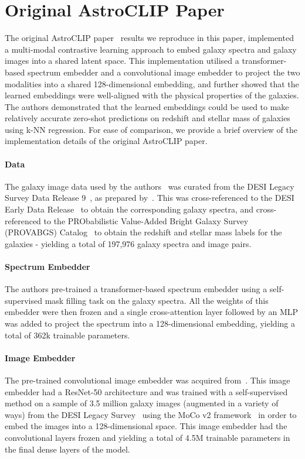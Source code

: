 
\section{Original AstroCLIP Paper}\label{sec:original-paper}
The original AstroCLIP paper~\cite{astroclip} results we reproduce in this paper, implemented a multi-modal contrastive
learning approach to embed galaxy spectra and galaxy images into a shared latent space.
This implementation utilised a transformer-based spectrum embedder and a convolutional image embedder to project the two
modalities into a shared 128-dimensional embedding, and further showed that the learned embeddings were well-aligned
with the physical properties of the galaxies.
The authors demonstrated that the learned embeddings could be used to make relatively accurate zero-shot predictions on
redshift and stellar mass of galaxies using k-NN regression.
For ease of comparison, we provide a brief overview of the implementation details of the original AstroCLIP paper.

\paragraph{Data} The galaxy image data used by the authors~\citep{astroclip} was curated from the DESI Legacy Survey Data
Release 9~\citep{desilegacy2018}, as prepared by~\cite{stein2021}.
This was cross-referenced to the DESI Early Data Release~\citep{desiearly2023} to obtain the corresponding galaxy spectra,
and cross-referenced to the PRObabilistic Value-Added Bright Galaxy Survey (PROVABGS) Catalog~\citep{provabgs2021}
to obtain the redshift and stellar mass labels for the galaxies - yielding a total of 197,976 galaxy spectra and image pairs.

\paragraph{Spectrum Embedder} The authors pre-trained a transformer-based spectrum embedder using a self-supervised mask
filling task on the galaxy spectra.
All the weights of this embedder were then frozen and a single cross-attention layer followed by an MLP was added to project
the spectrum into a 128-dimensional embedding, yielding a total of 362k trainable parameters.

\paragraph{Image Embedder} The pre-trained convolutional image embedder was acquired from~\cite{stein2021}.
This image embedder had a ResNet-50 architecture and was trained with a self-supervised method on a sample of 3.5 million
galaxy images (augmented in a variety of ways) from the DESI Legacy Survey~\citep{desilegacy2018} using the MoCo v2
framework~\citep{moco2020, mocov22020} in order to embed the images into a 128-dimensional space.
This image embedder had the convolutional layers frozen and yielding a total of 4.5M trainable parameters in the final
dense layers of the model.

